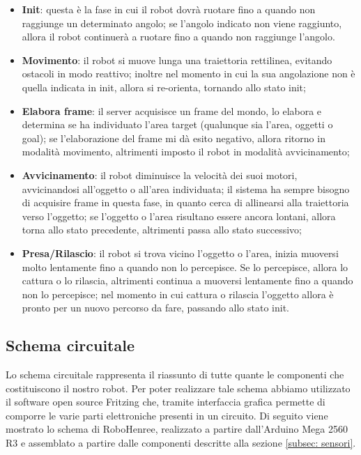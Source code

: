 \documentclass[a4paper,12pt,italian]{article}
\begin{document}
\begin{itemize}
	\item \textbf{Init}: questa è la fase in cui il robot dovrà ruotare fino a quando non raggiunge un determinato angolo; se l'angolo indicato non viene raggiunto, allora il robot continuerà a ruotare fino a quando non raggiunge l'angolo.
	\item \textbf{Movimento}: il robot si muove lunga una traiettoria rettilinea, evitando ostacoli in modo reattivo; inoltre nel momento in cui la sua angolazione non è quella indicata in init, allora si re-orienta, tornando allo stato init;
	\item \textbf{Elabora frame}: il server acquisisce un frame del mondo, lo elabora e determina se ha individuato l'area target (qualunque sia l'area, oggetti o goal); se l'elaborazione del frame mi dà esito negativo, allora ritorno in modalità movimento, altrimenti imposto il robot in modalità avvicinamento;
	\item \textbf{Avvicinamento}: il robot diminuisce la velocità dei suoi motori, avvicinandosi all'oggetto o all'area individuata; il sistema ha sempre bisogno di acquisire frame in questa fase, in quanto cerca di allinearsi alla traiettoria verso l'oggetto; se l'oggetto o l'area risultano essere ancora lontani, allora torna allo stato precedente, altrimenti passa allo stato successivo;
	\item \textbf{Presa/Rilascio}: il robot si trova vicino l'oggetto o l'area, inizia muoversi molto lentamente fino a quando non lo percepisce. Se lo percepisce, allora lo cattura o lo rilascia, altrimenti continua a muoversi lentamente fino a quando non lo percepisce; nel momento in cui cattura o rilascia l'oggetto allora è pronto per un nuovo percorso da fare, passando allo stato init.
\end{itemize}

\subsection{Schema circuitale}
Lo schema circuitale rappresenta il riassunto di tutte quante le componenti che costituiscono il nostro robot. Per poter realizzare tale schema abbiamo utilizzato il software open source Fritzing che, tramite interfaccia grafica permette di comporre le varie parti elettroniche presenti in un circuito. Di seguito viene mostrato lo schema di RoboHenree, realizzato a partire dall’Arduino Mega 2560 R3 e assemblato a partire dalle componenti descritte alla sezione \ref{subsec: sensori}.
\end{document}

